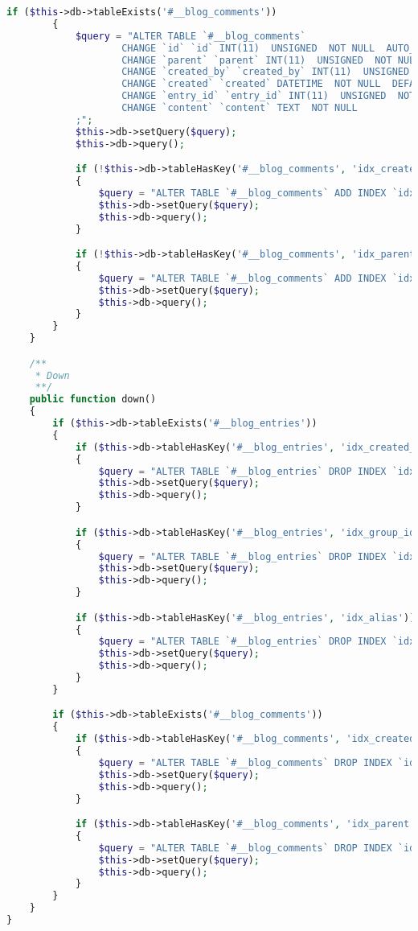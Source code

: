 \documentclass[10pt,letterpaper,titlepage]{article}
\begin{document}
\begin{lstlisting}[caption={\texttt{Migration20131108091700ComBlog.php} - an example of a properly formed Migration},language=PHP,label=migrationexample]
		if ($this->db->tableExists('#__blog_comments'))
		{
			$query = "ALTER TABLE `#__blog_comments`
					CHANGE `id` `id` INT(11)  UNSIGNED  NOT NULL  AUTO_INCREMENT,
					CHANGE `parent` `parent` INT(11)  UNSIGNED  NOT NULL  DEFAULT '0',
					CHANGE `created_by` `created_by` INT(11)  UNSIGNED  NOT NULL  DEFAULT '0',
					CHANGE `created` `created` DATETIME  NOT NULL  DEFAULT '0000-00-00 00:00:00',
					CHANGE `entry_id` `entry_id` INT(11)  UNSIGNED  NOT NULL  DEFAULT '0',
					CHANGE `content` `content` TEXT  NOT NULL
			;";
			$this->db->setQuery($query);
			$this->db->query();

			if (!$this->db->tableHasKey('#__blog_comments', 'idx_created_by'))
			{
				$query = "ALTER TABLE `#__blog_comments` ADD INDEX `idx_created_by` (`created_by`);";
				$this->db->setQuery($query);
				$this->db->query();
			}

			if (!$this->db->tableHasKey('#__blog_comments', 'idx_parent'))
			{
				$query = "ALTER TABLE `#__blog_comments` ADD INDEX `idx_parent` (`parent`);";
				$this->db->setQuery($query);
				$this->db->query();
			}
		}
	}

	/**
	 * Down
	 **/
	public function down()
	{
		if ($this->db->tableExists('#__blog_entries'))
		{
			if ($this->db->tableHasKey('#__blog_entries', 'idx_created_by'))
			{
				$query = "ALTER TABLE `#__blog_entries` DROP INDEX `idx_created_by`;";
				$this->db->setQuery($query);
				$this->db->query();
			}

			if ($this->db->tableHasKey('#__blog_entries', 'idx_group_id'))
			{
				$query = "ALTER TABLE `#__blog_entries` DROP INDEX `idx_group_id`;";
				$this->db->setQuery($query);
				$this->db->query();
			}

			if ($this->db->tableHasKey('#__blog_entries', 'idx_alias'))
			{
				$query = "ALTER TABLE `#__blog_entries` DROP INDEX `idx_alias`;";
				$this->db->setQuery($query);
				$this->db->query();
			}
		}

		if ($this->db->tableExists('#__blog_comments'))
		{
			if ($this->db->tableHasKey('#__blog_comments', 'idx_created_by'))
			{
				$query = "ALTER TABLE `#__blog_comments` DROP INDEX `idx_created_by`;";
				$this->db->setQuery($query);
				$this->db->query();
			}

			if ($this->db->tableHasKey('#__blog_comments', 'idx_parent'))
			{
				$query = "ALTER TABLE `#__blog_comments` DROP INDEX `idx_parent`;";
				$this->db->setQuery($query);
				$this->db->query();
			}
		}
	}
}
\end{lstlisting}
\end{document}
